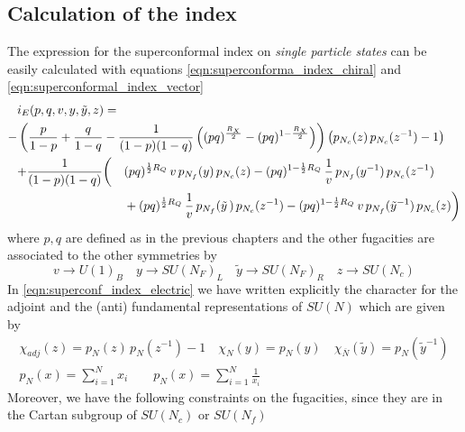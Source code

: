 \subsection{Calculation of the index}
The expression for the superconformal index on \emph{single particle states} can be easily calculated with equations \eqref{eqn:superconforma_index_chiral} and \eqref{eqn:superconformal_index_vector}
\begin{equation}
\begin{aligned}
 & i_E (p,q,v, y,\tilde y ,z) = \\ 
 -& \left({p \over 1-p}+{q \over 1-q} -{1 \over (1-p)(1-q)}
\left((p q)^{\frac{R_X}{2}}- (p q)^{1-\frac{R_X}{2}}\right)
\right) \left( p_{N_c}( z)\, p_{N_c}(z^{-1})-1\right ) \\ 
&
\begin{aligned}
+&
{1\over (1-p)(1-q)}
\bigg(
&&(p q)^{{1\over 2}R_Q} \, v \, p_{N_f}(y)\, p_{N_c}(z)
- (p q)^{1- {1\over 2}R_Q} \, {1 \over v}\, p_{{N_f}}(y^{-1})\, p_{{N_c}}(z^{-1}) \\
&
 && +
(p q)^{{1\over 2}R_Q}\, {1\over v}\, p_{{N_f}}({\tilde y}\,) \, p_{{N_c}}(z^{-1})
- (p q)^{1- {1\over 2}R_Q} \, v\, p_{N_f}({\tilde y}^{-1})\, p_{N_c}(z)\bigg) \\
\end{aligned}
\end{aligned}\label{eqn:superconf_index_electric}
\end{equation}
where $ p,q$ are defined as in the previous chapters and the other fugacities are associated to the other symmetries by
\begin{equation}
v \rightarrow U(1)_B \quad y \rightarrow SU(N_F)_L \quad \tilde{y} \rightarrow SU(N_F)_R \quad z \rightarrow SU(N_c) 
\end{equation}
In \eqref{eqn:superconf_index_electric} we have written explicitly the character for the adjoint and the (anti) fundamental representations of $SU(N)$ which are given by \
\begin{gather}
 \chi_{adj}(z) = p_{N}( z)\, p_{N}(z^{-1})-1 \quad \chi_{N}(y) = p_{N}(y) \quad \chi_{\overbar{N}}(\tilde{y}) = p_{N}(\tilde{y}^{-1}) \\
 p_{N}(x) = \sum_{i =1}^{N} x_i \qquad p_{N}(x) = \sum_{i =1}^{N} \frac{1}{x_i}
\end{gather}
Moreover, we have the following constraints on the fugacities, since they are in the Cartan subgroup of $SU(N_c)$ or $SU(N_f)$

